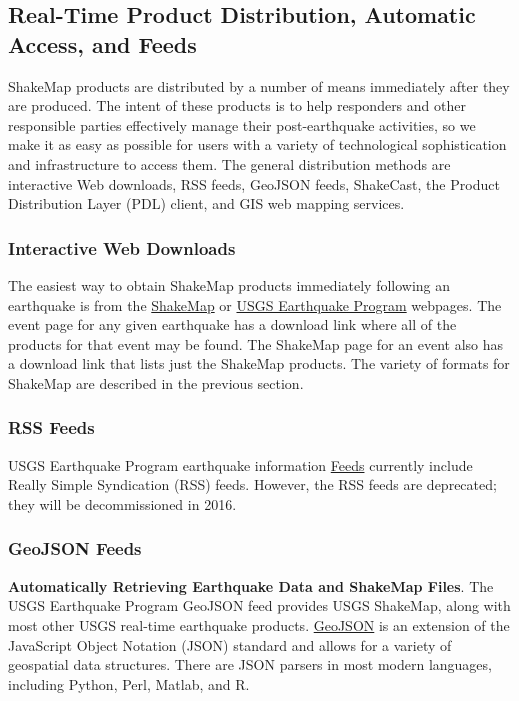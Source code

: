 \documentclass[letterpaper,10pt,english]{sphinxmanual}
\begin{document}
\subsection{Real-Time Product Distribution, Automatic Access, and Feeds}
\label{products:real-time-product-distribution-automatic-access-and-feeds}
ShakeMap products are distributed by a number of means immediately after they
are produced. The intent of these products is to help responders and
other responsible parties effectively manage their post-earthquake
activities, so we make it as easy as possible for users with a variety of
technological sophistication and infrastructure to access them. The general
distribution methods are
interactive Web downloads, RSS feeds, GeoJSON feeds, ShakeCast, the Product
Distribution Layer (PDL) client, and GIS web mapping services.


\subsubsection{Interactive Web Downloads}
\label{products:interactive-web-downloads}
The easiest way to obtain ShakeMap products immediately following an earthquake
is from the \href{http://earthquake.usgs.gov/earthquakes/shakemap/}{ShakeMap} or
\href{http://earthquake.usgs.gov/}{USGS Earthquake Program} webpages. The event
page for any given earthquake has a download link where all of the products for
that event may be found. The ShakeMap page for an event also has a download link
that lists just the ShakeMap products. The variety
of formats for ShakeMap are described in the previous section.


\subsubsection{RSS Feeds}
\label{products:rss-feeds}
USGS Earthquake Program earthquake information \href{http://earthquake.usgs.gov/earthquakes/feed/v1.0/}{Feeds} currently include Really
Simple Syndication (RSS) feeds. However, the RSS feeds are deprecated; they will be
decommissioned in 2016.


\subsubsection{GeoJSON Feeds}
\label{products:geojson-feeds}
\textbf{Automatically Retrieving Earthquake Data and ShakeMap Files}. The USGS
Earthquake Program GeoJSON feed provides USGS ShakeMap, along with most other USGS
real-time earthquake products. \href{http://geojson.org/}{GeoJSON} is an extension
of the JavaScript Object Notation (JSON) standard and allows for a
variety of geospatial data structures.  There are JSON parsers in most modern
languages, including Python, Perl, Matlab, and R.
\end{document}
